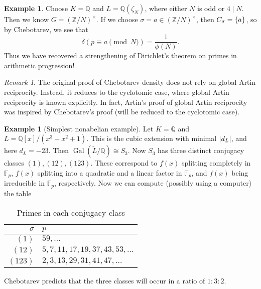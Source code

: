 \documentclass[leqno, openany]{memoir}
\theoremstyle{definition}
\newtheorem{exm}[thm]{Example}
\theoremstyle{remark}
\newtheorem{rmk}[thm]{Remark}
\theoremstyle{plain}
\theoremstyle{definition}
\theoremstyle{remark}
\newcommand{\F}{\mathbb{F}}
\newcommand{\Z}{\mathbb{Z}}
\newcommand{\Q}{\mathbb{Q}}
\newcommand{\wt}[1]{\widetilde{#1}}
\DeclareMathOperator{\Gal}{Gal}
\begin{document}
\begin{exm}
    Choose $K = \Q$ and $L = \Q(\zeta_N)$, where either $N$ is odd or $4 \mid N$. Then we know $G = {(\Z/N)}^{\times}$. If we choose $\sigma = a \in {(\Z/N)}^{\times}$, then $C_{\sigma} = \qty{a}$, so by Chebotarev, we see that 
    \[ \delta(p \equiv a \pmod{N}) = \frac{1}{\phi(N)}. \]
    Thus we have recovered a strengthening of Dirichlet's theorem on primes in arithmetic progression!
\end{exm}

\begin{rmk}
    The original proof of Chebotarev density does not rely on global Artin reciprocity. Instead, it reduces to the cyclotomic case, where global Artin reciprocity is known explicitly. In fact, Artin's proof of global Artin reciprocity was inspired by Chebotarev's proof (will be reduced to the cyclotomic case).
\end{rmk}

\begin{exm}[Simplest nonabelian example]
    Let $K = \Q$ and $L = \Q[x] / (x^3 - x^2 + 1)$. This is the cubic extension with minimal $\abs{d_L}$, and here $d_L = -23$. Then $\Gal(\wt{L}/\Q) \cong S_3$. Now $S_3$ has three distinct conjugacy classes $(1), (12), (123)$. These correspond to $f(x)$ splitting completely in $\F_p$, $f(x)$ splitting into a quadratic and a linear factor in $\F_p$, and $f(x)$ being irreducible in $\F_p$, respectively. Now we can compute (possibly using a computer) the table
    \begin{table}[H]
        \centering
        \caption{Primes in each conjugacy class}
        \label{tab:label}
        \begin{tabular}{rl}
        \toprule
        $\sigma$ & $p$ \\
        \midrule
        $(1)$ & $59, \ldots$ \\
        $(12)$ & $5,7,11,17,19,37,43,53,\ldots$ \\
        $(123)$ & $2,3,13,29,31,41,47,\ldots$ \\
        \bottomrule
        \end{tabular}
    \end{table}
    Chebotarev predicts that the three classes will occur in a ratio of $1:3:2$.
\end{exm}
\end{document}
